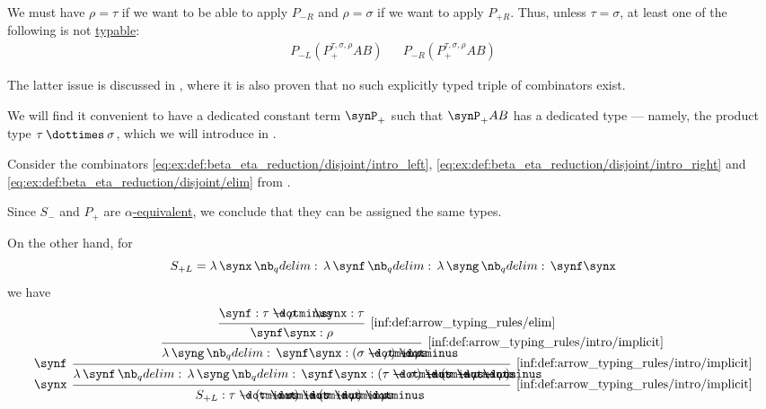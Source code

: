 \begin{example}
\begin{thmenum}
    We must have \( \rho = \tau \) if we want to be able to apply \( P_{-R} \) and \( \rho = \sigma \) if we want to apply \( P_{+R} \). Thus, unless \( \tau = \sigma \), at least one of the following is not \hyperref[def:typability]{typable}:
    \begin{align*}
      P_{-L} (P_+^{\tau,\sigma,\rho} A B)
      &&
      P_{-R} (P_+^{\tau,\sigma,\rho} A B)
    \end{align*}

    The latter issue is discussed in \cite{MathOF:product_type_in_simply_typed_lambda_terms}, where it is also proven that no such explicitly typed triple of combinators exist.

    We will find it convenient to have a dedicated constant term \( \synP_+ \) such that \( \synP_+ A B \) has a dedicated type --- namely, the product type \( \tau \syntimes \sigma \), which we will introduce in .

     Consider the combinators \ref{eq:ex:def:beta_eta_reduction/disjoint/intro_left}, \ref{eq:ex:def:beta_eta_reduction/disjoint/intro_right} and \ref{eq:ex:def:beta_eta_reduction/disjoint/elim} from .

    Since \( S_- \) and \( P_+ \) are \hyperref[def:lambda_term_alpha_equivalence]{\( \alpha \)-equivalent}, we conclude that they can be assigned the same types.

    On the other hand, for
    \begin{equation*}
      S_{+L} = \qabs \synx \qabs \synf \qabs \syng \synf \synx
    \end{equation*}
    we have
    \begin{equation*}
      \begin{prooftree}
        \hypo{ \synf: \tau \synimplies \rho }
        \hypo{ \synx: \tau }
        \infer2[\ref{inf:def:arrow_typing_rules/elim}]{ \synf \synx: \rho }
        \infer1[\ref{inf:def:arrow_typing_rules/intro/implicit}]{ \qabs \syng \synf \synx: (\sigma \synimplies \rho) \synimplies \rho }
        \infer[left label=\( \synf \)]1[\ref{inf:def:arrow_typing_rules/intro/implicit}]{ \qabs \synf \qabs \syng \synf \synx: (\tau \synimplies \sigma) \synimplies (\sigma \synimplies \rho \synimplies \rho) }
        \infer[left label=\( \synx \)]1[\ref{inf:def:arrow_typing_rules/intro/implicit}]{ S_{+L}: \tau \synimplies (\tau \synimplies \sigma) \synimplies (\sigma \synimplies \rho) \synimplies \rho }
      \end{prooftree}
    \end{equation*}


\end{thmenum}
\end{example}
